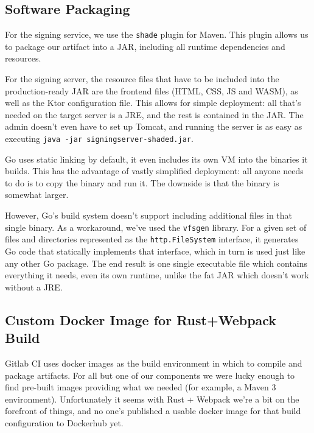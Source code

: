 \subsection{Software Packaging}\label{subsec:software-packaging}
For the signing service,
we use the \texttt{shade} plugin for Maven.
This plugin allows us to package our artifact into a \gls{JAR},
including all runtime dependencies and resources.

For the signing server,
the resource files that have to be included into the production-ready \gls{JAR}
are the frontend files (\gls{HTML}, \gls{CSS}, \gls{JS} and \gls{WASM}),
as well as the Ktor configuration file.
This allows for simple deployment:
all that's needed on the target server is a \gls{JRE},
and the rest is contained in the \gls{JAR}.
The admin doesn't even have to set up Tomcat,
and running the server is as easy as executing \texttt{java -jar signingserver-shaded.jar}.

Go uses static linking by default,
it even includes its own \gls{VM} into the binaries it builds.
This has the advantage of vastly simplified deployment:
all anyone needs to do is to copy the binary and run it.
The downside is that the binary is somewhat larger.

However, Go's build system doesn't support including additional files in that single binary.
As a workaround, we've used the \texttt{vfsgen} library.
For a given set of files and directories represented as the \texttt{http.FileSystem} interface,
it generates Go code that statically implements that interface,
which in turn is used just like any other Go package.
The end result is one single executable file which contains everything it needs,
even its own runtime, unlike the fat \gls{JAR} which doesn't work without a \gls{JRE}.

\subsection{Custom Docker Image for Rust+Webpack Build}\label{subsec:custom-docker-image-for-rust+webpack-build}
Gitlab \gls{CI} uses docker images as the build environment in which to compile and package artifacts.
For all but one of our components we were lucky enough to find pre-built images providing what we needed (for example, a Maven 3 environment).
Unfortunately it seems with Rust + Webpack we're a bit on the forefront of things,
and no one's published a usable docker image for that build configuration to Dockerhub yet.

